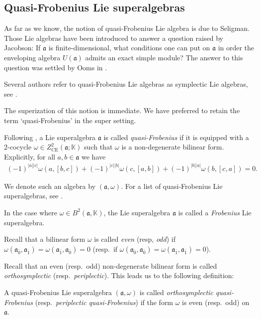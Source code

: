 \documentclass[10pt,a4paper]{amsart}
\numberwithin{equation}{section}
\begin{document}
\subsection{Quasi-Frobenius Lie superalgebras}\label{qFrobenius}

As far as we know, the notion of quasi-Frobenius Lie algebra is due to Seligman. Those Lie algebras have been introduced to answer a question raised by Jacobson: If $\mathfrak{a}$ is finite-dimensional,
what conditions one can put on $\mathfrak{a}$ in order the enveloping algebra $U(\mathfrak{a})$ admits an
exact simple module? The answer to this question was settled by Ooms in \cite{O}.

Several authors refer to quasi-Frobenius Lie algebras as symplectic Lie algebras, see \cite{AM, BC,BFLM,DM2,DM1, D, Fi, GR, MR2}.

The superization of this notion is immediate. We have preferred to retain the term ‘quasi-Frobenius’ in the super setting.

Following \cite{BaBe, BM}, a Lie superalgebra $\mathfrak{a}$ is called {\it quasi-Frobenius} if it is equipped with a 2-cocycle $\omega \in Z^2_ {\text{CE}}(\mathfrak{a}; \mathbb{K})$ such that $\omega$ is a non-degenerate bilinear form. Explicitly, for all $a,b\in \mathfrak{a}$ we have
\begin{gather*}%
(-1)^{|a||c|} \omega(a, [b , c]) +(-1)^{|c||b|} \omega(c, [a , b] )+(-1)^{|b||a|} \omega(b, [c , a] )=0.
\end{gather*}

We denote such an algebra by $(\mathfrak{a}, \omega)$. For a list of quasi-Frobenius Lie superalgebras, see \cite{BM}.

In the case where $\omega \in B^2(\mathfrak{a},\mathbb K)$, the Lie superalgebra $\mathfrak{a}$ is called a {\it Frobenius} Lie superalgebra.

Recall that a bilinear form $\omega$ is called {\it even} (resp, {\it odd}) if $\omega(\mathfrak{a}_{\bar 0}, \mathfrak{a}_{\bar 1})= \omega(\mathfrak{a}_{\bar 1},\mathfrak{a}_{\bar 0})=0$ (resp.\ if $\omega(\mathfrak{a}_{\bar 0}, \mathfrak{a}_{\bar 0})= \omega(\mathfrak{a}_{\bar 1},\mathfrak{a}_{\bar 1})=0$).

Recall that an even (resp.\ odd) non-degenerate bilinear form is called {\it orthosymplectic} (resp.\ {\it periplectic}). This leads us to the following definition:

A quasi-Frobenius Lie superalgebra $(\mathfrak{a}, \omega )$ is called {\it orthosymplectic quasi-Frobenius} (resp.\ {\it periplectic quasi-Frobenius}) if the form $\omega$ is even (resp.\ odd) on $\mathfrak{a}$.
\end{document}
